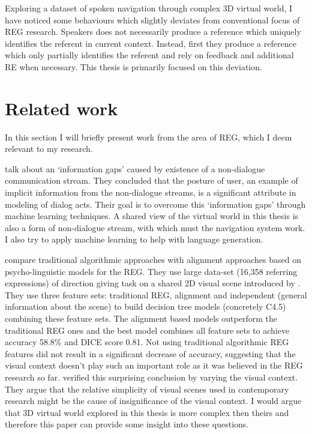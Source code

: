 Exploring a dataset of spoken navigation through complex 3D virtual world, I have noticed some behaviours which slightly deviates from conventional focus of REG research. Speakers does not necessarily produce a reference which uniquely identifies the referent in current context. Instead, first they produce a reference which only partially identifies the referent and rely on feedback and additional RE when necessary. This thesis is primarily focused on this deviation.

\section{Related work}
\label{sec:relwork}
In this section I will briefly present work from the area of REG, which I deem relevant to my research.

\citet{ha2012combining} talk about an `information gaps' caused by existence of a non-dialogue communication stream. They concluded that the posture of user, an example of implicit information from the non-dialogue streams, is a significant attribute in modeling of dialog acts. Their goal is to overcome this `information gaps' through machine learning techniques. A shared view of the virtual world in this thesis is also a form of non-dialogue stream, with which must the navigation system work. I also try to apply machine learning to help with language generation.

\citet{viethen2011generating} compare traditional algorithmic approaches with alignment approaches based on psycho-linguistic models for the REG. They use large data-set (16,358 referring expressions) of direction giving task on a shared 2D visual scene introduced by \citet{louwerse2007multimodal}. They use three feature sets: traditional REG, alignment and independent (general information about the scene) to build decision tree models (concretely C4.5) combining these feature sets. The alignment based models outperform the traditional REG ones and the best model combines all feature sets to achieve accuracy 58.8\% and DICE score 0.81. Not using traditional algorithmic REG features did not result in a significant decrease of accuracy, suggesting that the visual context doesn't play such an important role as it was believed in the REG research so far.  \citet{viethen2011impact} verified this surprising conclusion by varying the visual context. They argue that the relative simplicity of visual scenes used in contemporary research might be the cause of insignificance of the visual context. I would argue that 3D  virtual world explored in this thesis is more complex then theirs and therefore this paper can provide some insight into these questions.  

